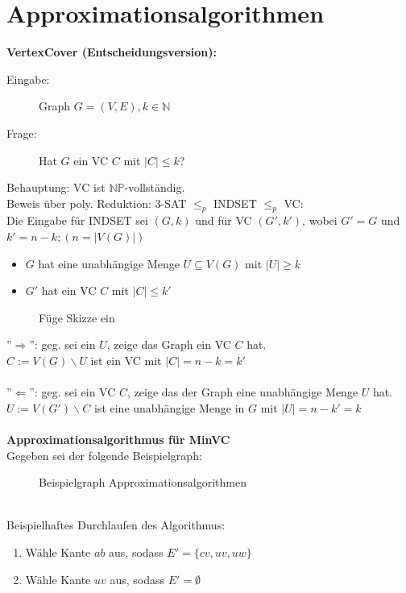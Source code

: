 \documentclass{article} %
\begin{document}
\section{Approximationsalgorithmen}
\begin{framed}
	\textbf{VertexCover (Entscheidungsversion):}
	\begin{description}
		\item  [Eingabe:]Graph $G=(V,E), k \in \mathbb{N}$
		\item [Frage:] Hat $G$ ein VC $C$ mit $|C| \leq k$?
	\end{description}
\end{framed}
Behauptung: VC ist $\mathbb{NP}$-vollständig.\\
Beweis über poly. Reduktion: 3-SAT $\leq_p$ INDSET $\leq_p$ VC:\\
Die Eingabe für INDSET sei $(G, k)$ und für VC $(G', k')$, wobei $G' = G$ und $k' = n - k; (n = |V(G)|)$
\begin{itemize}
	\item $G$ hat eine unabhängige Menge $U \subseteq V(G)$ mit $|U| \geq k$
	\item $G'$ hat ein VC $C$ mit $|C| \leq k'$
\end{itemize}
\begin{figure}[!htp]
	\centering
	\caption{Füge Skizze ein}
\end{figure}
''$\Rightarrow$'': geg. sei ein $U$, zeige das Graph ein VC $C$ hat.\\
$C := V(G) \backslash U$ ist ein VC mit $|C| = n-k = k'$\\
\\
''$\Leftarrow$'': geg. sei ein VC $C$, zeige das der Graph eine unabhängige Menge $U$ hat.\\
$U := V(G') \backslash C$ ist eine unabhängige Menge in $G$ mit $|U| = n-k' = k$\\
\\
\textbf{Approximationsalgorithmus für MinVC}\\
Gegeben sei der folgende Beispielgraph:
\begin{figure}[!htp]
	\centering
	\caption{Beispielgraph Approximationsalgorithmen}
\end{figure}\\
Beispielhaftes Durchlaufen des Algorithmus:
\begin{enumerate}
	\item Wähle Kante $ab$ aus, sodass $E' = \{cv, uv, uw\}$
	\item Wähle Kante $uv$ aus, sodass $E' = \emptyset$
\end{enumerate}
\end{document}

